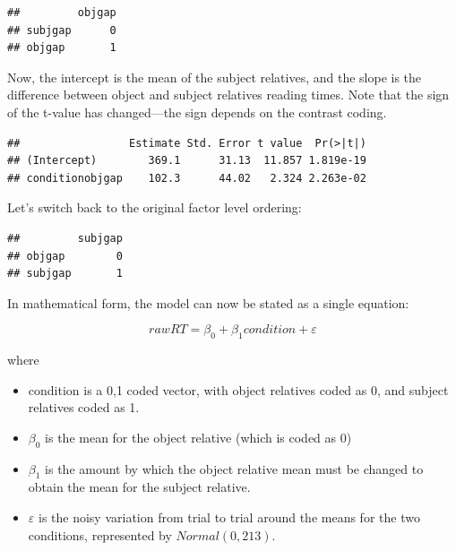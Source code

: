 \documentclass[12pt,]{krantz}
\newenvironment{Shaded}{\begin{snugshade}}{\end{snugshade}}
\newcommand{\DataTypeTok}[1]{\textcolor[rgb]{0.13,0.29,0.53}{#1}}
\newcommand{\KeywordTok}[1]{\textcolor[rgb]{0.13,0.29,0.53}{\textbf{#1}}}
\newcommand{\NormalTok}[1]{#1}
\newcommand{\OperatorTok}[1]{\textcolor[rgb]{0.81,0.36,0.00}{\textbf{#1}}}
\newcommand{\StringTok}[1]{\textcolor[rgb]{0.31,0.60,0.02}{#1}}
\providecommand{\tightlist}{%
  \setlength{\itemsep}{0pt}\setlength{\parskip}{0pt}}
\begin{document}
\begin{verbatim}
##         objgap
## subjgap      0
## objgap       1
\end{verbatim}

Now, the intercept is the mean of the subject relatives, and the slope is the difference between object and subject relatives reading times. Note that the sign of the t-value has changed---the sign depends on the contrast coding.

\begin{Shaded}
\end{Shaded}

\begin{verbatim}
##                 Estimate Std. Error t value  Pr(>|t|)
## (Intercept)        369.1      31.13  11.857 1.819e-19
## conditionobjgap    102.3      44.02   2.324 2.263e-02
\end{verbatim}

Let's switch back to the original factor level ordering:

\begin{Shaded}
\end{Shaded}

\begin{verbatim}
##         subjgap
## objgap        0
## subjgap       1
\end{verbatim}

In mathematical form, the model can now be stated as a single equation:

\begin{equation}
rawRT = \beta_0 + \beta_1 condition + \varepsilon
\end{equation}

where

\begin{itemize}
\tightlist
\item
  condition is a 0,1 coded vector, with object relatives coded as 0, and subject relatives coded as 1.
\item
  \(\beta_0\) is the mean for the object relative (which is coded as 0)
\item
  \(\beta_1\) is the amount by which the object relative mean must be
  changed to obtain the mean for the subject relative.
\item
  \(\varepsilon\) is the noisy variation from trial to trial around the means for the two conditions, represented by \(Normal(0,213)\).
\end{itemize}
\end{document}
